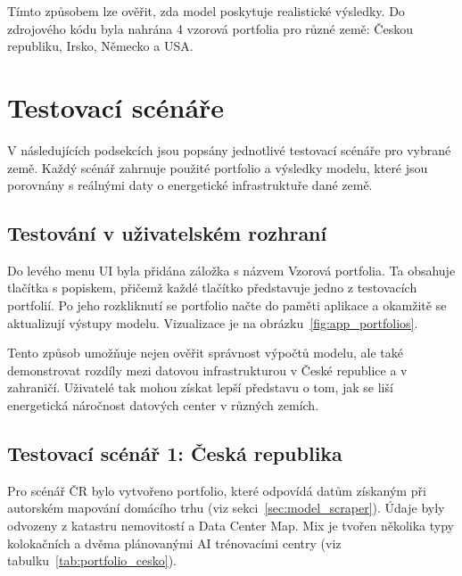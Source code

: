 Tímto způsobem lze ověřit, zda model poskytuje realistické výsledky. Do zdrojového kódu byla nahrána 4 vzorová portfolia pro různé země: Českou republiku, Irsko, Německo a USA.

\section{Testovací scénáře}
\label{sec:testovani_scenare}

V následujících podsekcích jsou popsány jednotlivé testovací scénáře pro vybrané země. Každý scénář zahrnuje použité portfolio a výsledky modelu, které jsou porovnány s reálnými daty o energetické infrastruktuře dané země. 

\subsection{Testování v uživatelském rozhraní}
\label{subsec:testovani_uzivatelske_rozhrani}

Do levého menu UI byla přidána záložka s názvem Vzorová portfolia. Ta obsahuje tlačítka s popiskem, přičemž každé tlačítko představuje jedno z testovacích portfolií. Po jeho rozkliknutí se portfolio načte do paměti aplikace a okamžitě se aktualizují výstupy modelu. Vizualizace je na obrázku~\ref{fig:app_portfolios}.

Tento způsob umožňuje nejen ověřit správnost výpočtů modelu, ale také demonstrovat rozdíly mezi datovou infrastrukturou v České republice a v zahraničí. Uživatelé tak mohou získat lepší představu o tom, jak se liší energetická náročnost datových center v různých zemích.

\subsection{Testovací scénář 1: Česká republika}
\label{subsec:testovani_cesko}

Pro scénář ČR bylo vytvořeno portfolio, které odpovídá datům získaným při autorském mapování domácího trhu (viz sekci~\ref{sec:model_scraper}). Údaje byly odvozeny z katastru nemovitostí a Data Center Map. Mix je tvořen několika typy kolokačních a dvěma plánovanými AI trénovacími centry (viz tabulku~\ref{tab:portfolio_cesko}).

